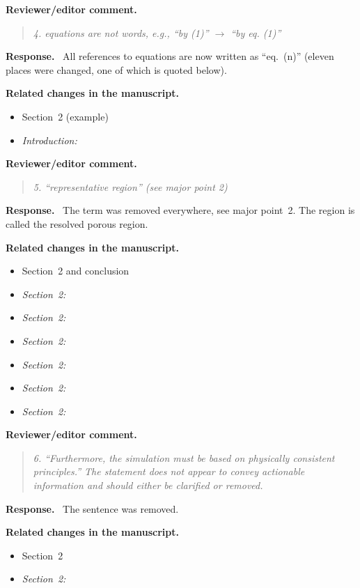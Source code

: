 \documentclass[pdflatex,sn-mathphys-num]{sn-jnl}
\newenvironment{reviewercomment}
  {\par\noindent\textbf{Reviewer/editor comment.}\begin{quote}\itshape}
  {\end{quote}}
\newenvironment{response}
  {\par\noindent\textbf{Response.}\ }
  {\par}
\newenvironment{relatedchanges}
  {\par\noindent\textbf{Related changes in the manuscript.}\begin{itemize}\small}
  {\end{itemize}}
\newcommand{\msloc}[1]{\textit{#1:}\ }
\newcommand{\relhead}[1]{\item[]\vspace*{0.2\baselineskip}#1}
\begin{document}
\begin{reviewercomment}
4. equations are not words, e.g., ``by (1)'' $\to$ ``by eq. (1)''
\end{reviewercomment}
\begin{response}
All references to equations are now written as ``eq.~(n)'' (eleven places were changed, one of which is quoted below).
\end{response}
\begin{relatedchanges}
\relhead{Section~2 (example)}
\item \msloc{Introduction}
\end{relatedchanges}

\begin{reviewercomment}
5. ``representative region'' (see major point 2)
\end{reviewercomment}
\begin{response}
The term was removed everywhere, see major point~2. The region is called the resolved porous region.
\end{response}
\begin{relatedchanges}
\relhead{Section~2 and conclusion}
\item \msloc{Section~2}
\item \msloc{Section~2}
\item \msloc{Section~2}
\item \msloc{Section~2}
\item \msloc{Section~2}
\item \msloc{Section~2}
\end{relatedchanges}

\begin{reviewercomment}
6. ``Furthermore, the simulation must be based on physically consistent principles.'' The statement does not appear to
convey actionable information and should either be clarified or removed.
\end{reviewercomment}
\begin{response}
The sentence was removed.
\end{response}
\begin{relatedchanges}
\relhead{Section~2}
\item \msloc{Section~2}
\end{relatedchanges}
\end{document}
